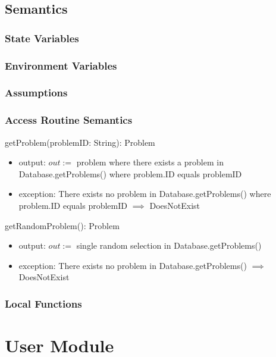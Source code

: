 \documentclass[12pt, titlepage]{article}
\begin{document}
\subsection{Semantics}

\subsubsection{State Variables}

\subsubsection{Environment Variables}

\subsubsection{Assumptions}

\subsubsection{Access Routine Semantics}

\noindent getProblem(problemID: String): Problem
\begin{itemize}
\item output: $out := $ problem where there exists a problem in Database.getProblems() where problem.ID equals problemID
\item exception: There exists no problem in Database.getProblems() where problem.ID equals problemID $\implies$ DoesNotExist
\end{itemize}


\noindent getRandomProblem(): Problem
\begin{itemize}
\item output: $out := $ single random selection in Database.getProblems()
\item exception: There exists no problem in Database.getProblems() $\implies$ DoesNotExist
\end{itemize}

\subsubsection{Local Functions}

\newpage


\section{User Module} \label{User}
\end{document}
